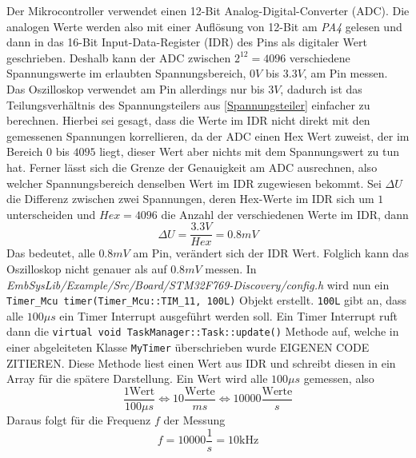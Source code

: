 Der Mikrocontroller verwendet einen 12-Bit Analog-Digital-Converter (ADC).
Die analogen Werte werden also mit einer Auflösung von 12-Bit am \textit{PA4} gelesen und dann
in das 16-Bit Input-Data-Register (IDR) des Pins als digitaler Wert
geschrieben\cite{MikroControllerDatasheet_1}.
Deshalb kann der ADC zwischen $2^{12} = 4096$ verschiedene Spannungswerte im erlaubten Spannungsbereich,
$0V$ bis $3.3V$, am Pin messen\cite{MikroControllerDatasheet_1}.
Das Oszilloskop verwendet am Pin allerdings nur bis $3V$, dadurch ist das Teilungsverhältnis des Spannungsteilers
aus \ref{Spannungsteiler} einfacher zu berechnen. \newline
Hierbei sei gesagt, dass die Werte im IDR nicht direkt mit den gemessenen Spannungen korrellieren,
da der ADC einen Hex Wert zuweist, der im Bereich $0$ bis $4095$ liegt, dieser Wert aber nichts mit
dem Spannungswert zu tun hat. \newline
Ferner lässt sich die Grenze der Genauigkeit am ADC ausrechnen, also welcher Spannungsbereich denselben
Wert im IDR zugewiesen bekommt. \newline
Sei $\Delta U$ die Differenz zwischen zwei Spannungen, deren Hex-Werte im IDR sich um $1$
unterscheiden und $Hex = 4096$ die Anzahl der verschiedenen Werte im IDR,
dann
$$\Delta U = \frac{3.3V}{Hex} = 0.8mV$$
Das bedeutet, alle $0.8mV$ am Pin, verändert sich der IDR Wert. \newline
Folglich kann das Oszilloskop nicht genauer als auf $0.8mV$ messen.
\newline \newline
In \textit{EmbSysLib/Example/Src/Board/STM32F769-Discovery/config.h} wird nun ein
\texttt{Timer\_Mcu timer(Timer\_Mcu::TIM\_11, 100L)} Objekt erstellt\cite{EmbSysLib}. \newline
\texttt{100L} gibt an, dass alle $100\mu s$ ein Timer Interrupt ausgeführt werden soll.
Ein Timer Interrupt ruft dann die \texttt{virtual void TaskManager::Task::update()} Methode auf,
welche in einer abgeleiteten Klasse \texttt{MyTimer} überschrieben wurde EIGENEN CODE ZITIEREN.
Diese Methode liest einen Wert aus IDR und schreibt diesen in ein Array
für die spätere Darstellung. \newline
Ein Wert wird alle $100\mu s$ gemessen, also
$$
\frac{1 \text{Wert}}{100 \mu s} \iff 10\frac{\text{Werte}}{ms}
\iff 10000 \frac{\text{Werte}}{s}
$$
Daraus folgt für die Frequenz $f$ der Messung
$$
f = 10000 \frac{1}{s} = 10 \si{\kilo\hertz}
$$

